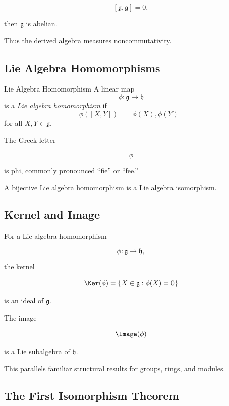 \[ [\mathfrak g,\mathfrak g]=0, \]

then \(\mathfrak g\) is abelian.

Thus the derived algebra measures noncommutativity.

\subsection{Lie Algebra Homomorphisms}
\label{subsec:lie-algebra-homomorphisms}

\begin{definitionbox}{Lie Algebra Homomorphism}
A linear map
\[ \phi:\mathfrak g\to\mathfrak h \]
is a \emph{Lie algebra homomorphism} if
\[ \phi([X,Y])=[\phi(X),\phi(Y)] \]
for all \(X,Y\in\mathfrak g\).
\end{definitionbox}

The Greek letter

\[ \phi \]

is phi, commonly pronounced ``fie'' or ``fee.''

A bijective Lie algebra homomorphism is a Lie algebra isomorphism.

\subsection{Kernel and Image}
\label{subsec:lie-homomorphism-kernel-image}

For a Lie algebra homomorphism

\[ \phi:\mathfrak g\to\mathfrak h, \]

the kernel

\[ \Ker(\phi)=\{X\in\mathfrak g:\phi(X)=0\} \]

is an ideal of \(\mathfrak g\).

The image

\[ \Image(\phi) \]

is a Lie subalgebra of \(\mathfrak h\).

This parallels familiar structural results for groups, rings, and modules.

\subsection{The First Isomorphism Theorem}
\label{subsec:lie-first-isomorphism}

